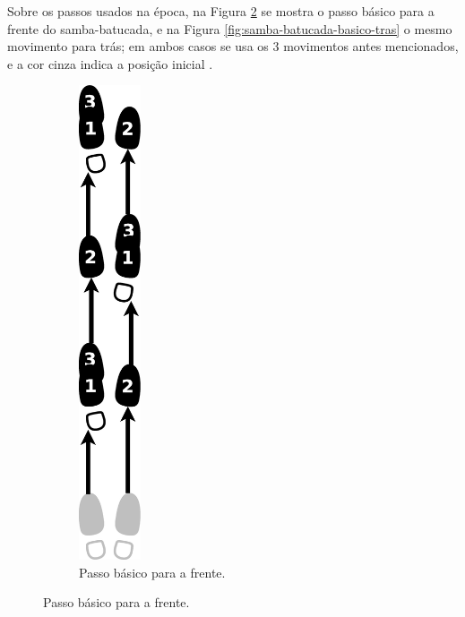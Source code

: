 \begin{itemize}
Sobre os passos usados na época, 
na Figura \ref{fig:samba-batucada-basico-frente} se mostra o passo básico para a frente do samba-batucada,
e na  Figura \ref{fig:samba-batucada-basico-tras} o mesmo movimento para trás;
em ambos casos se usa os 3 movimentos antes mencionados, e a cor cinza indica a posição inicial \cite[pp. 61-62]{fornaciari1947aprender} \cite[pp. 63]{freitas1959danca}. 
\begin{figure}[h]
    \centering
    \begin{subfigure}[b]{0.3\textwidth}
        \centering
        \includegraphics[width=0.2\textwidth]{chapters/cap-historia-sambagafieira/samba-batucada-basico-frente.eps}
        \caption{Passo básico para a frente.}
        \label{fig:samba-batucada-basico-frente}

\end{subfigure}
\end{figure}
\end{itemize}
